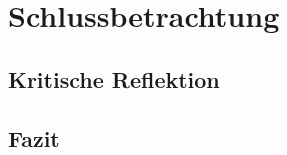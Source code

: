 \chapter{Schlussbetrachtung}\label{chapter:schlussbetrachtung}

\section{Kritische Reflektion}\label{chapter:kr}

\section{Fazit}\label{chapter:fazit}